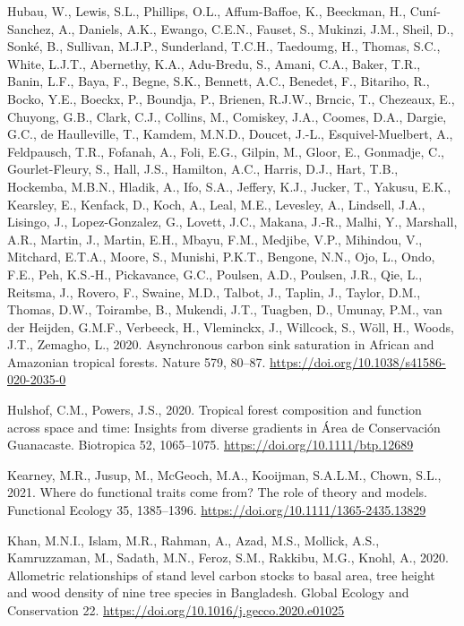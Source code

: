 \documentclass[
  12pt,
]{article}
\newlength{\cslhangindent}
\newlength{\cslentryspacingunit} %
\newenvironment{CSLReferences}[2] %
 {%
  \setlength{\parindent}{0pt}
  \ifodd #1
  \let\oldpar\par
  \def\par{\hangindent=\cslhangindent\oldpar}
  \fi
  \setlength{\parskip}{#2\cslentryspacingunit}
 }%
 {}
\begin{document}
\begin{CSLReferences}{1}{0}
\leavevmode{}%
Hubau, W., Lewis, S.L., Phillips, O.L., Affum-Baffoe, K., Beeckman, H., Cuní-Sanchez, A., Daniels, A.K., Ewango, C.E.N., Fauset, S., Mukinzi, J.M., Sheil, D., Sonké, B., Sullivan, M.J.P., Sunderland, T.C.H., Taedoumg, H., Thomas, S.C., White, L.J.T., Abernethy, K.A., Adu-Bredu, S., Amani, C.A., Baker, T.R., Banin, L.F., Baya, F., Begne, S.K., Bennett, A.C., Benedet, F., Bitariho, R., Bocko, Y.E., Boeckx, P., Boundja, P., Brienen, R.J.W., Brncic, T., Chezeaux, E., Chuyong, G.B., Clark, C.J., Collins, M., Comiskey, J.A., Coomes, D.A., Dargie, G.C., de Haulleville, T., Kamdem, M.N.D., Doucet, J.-L., Esquivel-Muelbert, A., Feldpausch, T.R., Fofanah, A., Foli, E.G., Gilpin, M., Gloor, E., Gonmadje, C., Gourlet-Fleury, S., Hall, J.S., Hamilton, A.C., Harris, D.J., Hart, T.B., Hockemba, M.B.N., Hladik, A., Ifo, S.A., Jeffery, K.J., Jucker, T., Yakusu, E.K., Kearsley, E., Kenfack, D., Koch, A., Leal, M.E., Levesley, A., Lindsell, J.A., Lisingo, J., Lopez-Gonzalez, G., Lovett, J.C., Makana, J.-R., Malhi, Y., Marshall, A.R., Martin, J., Martin, E.H., Mbayu, F.M., Medjibe, V.P., Mihindou, V., Mitchard, E.T.A., Moore, S., Munishi, P.K.T., Bengone, N.N., Ojo, L., Ondo, F.E., Peh, K.S.-H., Pickavance, G.C., Poulsen, A.D., Poulsen, J.R., Qie, L., Reitsma, J., Rovero, F., Swaine, M.D., Talbot, J., Taplin, J., Taylor, D.M., Thomas, D.W., Toirambe, B., Mukendi, J.T., Tuagben, D., Umunay, P.M., van der Heijden, G.M.F., Verbeeck, H., Vleminckx, J., Willcock, S., Wöll, H., Woods, J.T., Zemagho, L., 2020. Asynchronous carbon sink saturation in {African} and {Amazonian} tropical forests. Nature 579, 80--87. \url{https://doi.org/10.1038/s41586-020-2035-0}

\leavevmode{}%
Hulshof, C.M., Powers, J.S., 2020. Tropical forest composition and function across space and time: {Insights} from diverse gradients in {Área} de {Conservación Guanacaste}. Biotropica 52, 1065--1075. \url{https://doi.org/10.1111/btp.12689}

\leavevmode{}%
Kearney, M.R., Jusup, M., McGeoch, M.A., Kooijman, S.A.L.M., Chown, S.L., 2021. Where do functional traits come from? {The} role of theory and models. Functional Ecology 35, 1385--1396. \url{https://doi.org/10.1111/1365-2435.13829}

\leavevmode{}%
Khan, M.N.I., Islam, M.R., Rahman, A., Azad, M.S., Mollick, A.S., Kamruzzaman, M., Sadath, M.N., Feroz, S.M., Rakkibu, M.G., Knohl, A., 2020. Allometric relationships of stand level carbon stocks to basal area, tree height and wood density of nine tree species in {Bangladesh}. Global Ecology and Conservation 22. \url{https://doi.org/10.1016/j.gecco.2020.e01025}


\end{CSLReferences}
\end{document}
